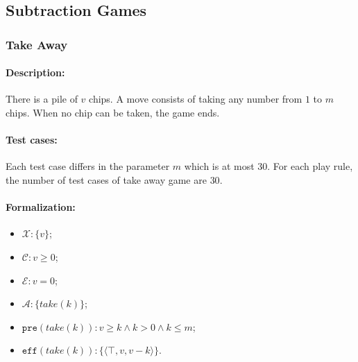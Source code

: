 \documentclass[review]{elsarticle}
\newcommand{\set}[1]{\{ #1 \}}
\newcommand{\tuple}[1]{\langle {#1} \rangle}
\newcommand{\true}{\top}
\newcommand{\statevar}{\mathcal{X}}
\newcommand{\act}{\mathcal{A}}
\newcommand{\constraint}{\mathcal{C}}
\newcommand{\estate}{\mathcal{E}}
\newcommand{\pre}{\mathtt{pre}}
\newcommand{\eff}{\mathtt{eff}}
\begin{document}


\subsection{Subtraction Games}

\subsubsection{Take Away \protect\cite{Gol1966}}
\paragraph{Description:}
There is a pile of $v$ chips. 
A move consists of taking any number from $1$ to $m$ chips.
When no chip can be taken, the game ends.

\paragraph{Test cases:} 
Each test case differs in the parameter $m$ which is at most $30$.
For each play rule, the number of test cases of take away game are $30$. %

\paragraph{Formalization:}

\begin{itemize}
	\item $\statevar: \set{v}$;
	\item $\constraint: v \ge 0$;
	\item $\estate: v = 0$;
	\item $\act:\set{take(k)}$;
		\item $\pre(take(k)) : v \ge k \wedge k > 0 \wedge k \le m$;
		\item $\eff(take(k)) : \set{\tuple{\true, v, v - k}}$.
\end{itemize}
\end{document}
